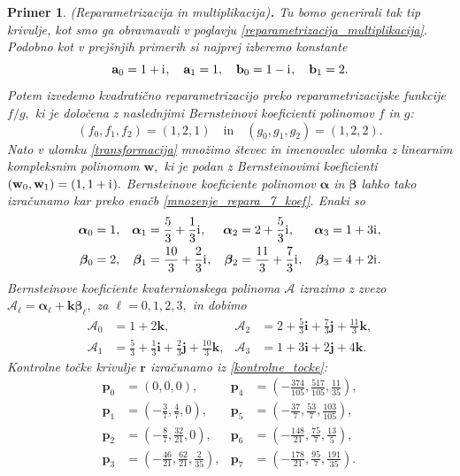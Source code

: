 \documentclass[12pt,a4paper,twoside]{article}
\newcommand{\iu}{\mathrm{i}\mkern1mu} %
\theoremstyle{definition} %
\theoremstyle{plain} %
\theoremstyle{primerstyle}
\newtheorem{primer}[definicija]{Primer}
\numberwithin{equation}{section}  %
\newcommand{\aV}{\mathbf{a}}
\newcommand{\bV}{\mathbf{b}}
\newcommand{\pV}{\mathbf{p}}
\newcommand{\rV}{\mathbf{r}}
\newcommand{\iV}{\mathbf{i}}
\newcommand{\jV}{\mathbf{j}}
\newcommand{\kV}{\mathbf{k}}
\newcommand{\wV}{\mathbf{w}}
\newcommand{\AQ}{\mathcal{A}}
\newcommand{\balpha}{\boldsymbol \alpha}
\newcommand{\bbeta}{\boldsymbol \beta}
\begin{document}
\begin{primer}
	\label{primer3}
	\textnormal{ }(Reparametrizacija in multiplikacija)\textbf{.}
	Tu bomo generirali tak tip krivulje, kot smo ga obravnavali v poglavju \ref{reparametrizacija_multiplikacija}. Podobno kot v prejšnjih primerih si najprej izberemo konstante
	\begin{equation*}
		\aV_0=1+\iu,\quad\aV_1=1,\quad\bV_0=1-\iu,\quad\bV_1=2.
	\end{equation*}
	Potem izvedemo kvadratično reparametrizacijo preko reparametrizacijske funkcije $f/g,$ ki je določena z naslednjimi Bernsteinovi koeficienti polinomov $f$ in $g$:
	$$(f_0,f_1,f_2)=(1,2,1)\quad\text{in}\quad(g_0,g_1,g_2)=(1,2,2).$$ Nato v ulomku \eqref{transformacija} množimo števec in imenovalec ulomka z linearnim kompleksnim polinomom $\wV,$ ki je podan z Bernsteinovimi koeficienti $(\wV_0,\wV_1)=(1,1+\iu).$ Bernsteinove koeficiente polinomov $\balpha$ in $\bbeta$ lahko tako izračunamo kar preko enačb \eqref{mnozenje_repara_7_koef}. Enaki so
	\begin{align*}
		\balpha_0&=1,&\balpha_1&=\frac{5}{3}+\frac{1}{3}\iu,&\balpha_2&=2+\frac{5}{3}\iu,&\balpha_3&=1+3\iu,\\
		\bbeta_0&=2,&\bbeta_1&=\frac{10}{3}+\frac{2}{3}\iu,&\bbeta_2&=\frac{11}{3}+\frac{7}{3}\iu,&\bbeta_3&=4+2\iu.
	\end{align*}
	Bernsteinove koeficiente kvaternionskega polinoma $\AQ$ izrazimo z zvezo $\AQ_\ell=\balpha_\ell+\kV\bbeta_\ell,$ za $\ell=0,1,2,3,$ in dobimo
	\begin{align*}
		\AQ_0&=1+2\kV,&\AQ_2&=2+\frac{5}{3}\iV+\frac{7}{3}\jV+\frac{11}{3}\kV,\\
		\AQ_1&=\frac{5}{3}+\frac{1}{3}\iV+\frac{2}{3}\jV+\frac{10}{3}\kV,&\AQ_3&=1+3\iV+2\jV+4\kV.
	\end{align*}
	Kontrolne točke krivulje $\rV$ izračunamo iz \eqref{kontrolne_tocke}:
	\begin{align*}
		\pV_0&=(0,0,0),&\pV_4&=\left(-\frac{374}{105},\frac{517}{105},\frac{11}{35}\right)\!,\\
		\pV_1&=\left(-\frac{3}{7},\frac{4}{7},0 \right)\!,&\pV_5&=\left(-\frac{37}{7},\frac{53}{7},\frac{103}{105}\right)\!,\\
		\pV_2&=\left(-\frac{8}{7},\frac{32}{21},0\right)\!,&\pV_6&=\left(-\frac{148}{21},\frac{75}{7},\frac{13}{5}\right)\!,\\
		\pV_3&=\left(-\frac{46}{21},\frac{62}{21},\frac{2}{35}\right)\!,&\pV_7&=\left(-\frac{178}{21},\frac{95}{7},\frac{191}{35}\right)\!.
	\end{align*}

\end{primer}
\end{document}
